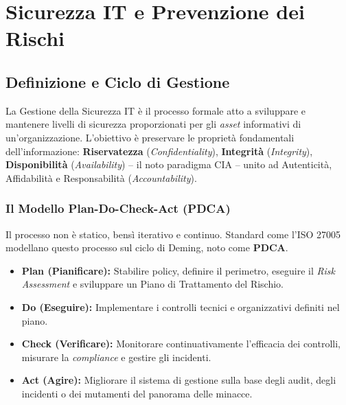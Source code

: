\chapter{Sicurezza IT e Prevenzione dei Rischi}
\section{Definizione e Ciclo di Gestione}
La Gestione della Sicurezza IT è il processo formale atto a sviluppare e mantenere livelli di sicurezza proporzionati per gli \textit{asset} informativi di un'organizzazione. L'obiettivo è preservare le proprietà fondamentali dell'informazione: \textbf{Riservatezza} (\textit{Confidentiality}), \textbf{Integrità} (\textit{Integrity}), \textbf{Disponibilità} (\textit{Availability}) -- il noto paradigma CIA -- unito ad Autenticità, Affidabilità e Responsabilità (\textit{Accountability}).

\subsection{Il Modello Plan-Do-Check-Act (PDCA)}
Il processo non è statico, bensì iterativo e continuo. Standard come l'ISO 27005 modellano questo processo sul ciclo di Deming, noto come \textbf{PDCA}.



\begin{itemize}
    \item \textbf{Plan (Pianificare):} Stabilire policy, definire il perimetro, eseguire il \textit{Risk Assessment} e sviluppare un Piano di Trattamento del Rischio.
    \item \textbf{Do (Eseguire):} Implementare i controlli tecnici e organizzativi definiti nel piano.
    \item \textbf{Check (Verificare):} Monitorare continuativamente l'efficacia dei controlli, misurare la \textit{compliance} e gestire gli incidenti.
    \item \textbf{Act (Agire):} Migliorare il sistema di gestione sulla base degli audit, degli incidenti o dei mutamenti del panorama delle minacce.
\end{itemize}

